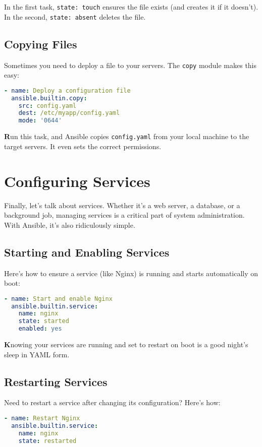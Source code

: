 In the first task, \texttt{state: touch} ensures the file exists (and creates it if it doesn't). In the second, \texttt{state: absent} deletes the file.

\subsection{Copying Files}

Sometimes you need to deploy a file to your servers. The \texttt{copy} module makes this easy:
\begin{lstlisting}[language=yaml, caption=Copying a File]
- name: Deploy a configuration file
  ansible.builtin.copy:
    src: config.yaml
    dest: /etc/myapp/config.yaml
    mode: '0644'
\end{lstlisting}

\textbf{R}un this task, and Ansible copies \texttt{config.yaml} from your local machine to the target servers. It even sets the correct permissions.

\section{Configuring Services}

Finally, let's talk about services. Whether it's a web server, a database, or a background job, managing services is a critical part of system administration. With Ansible, it's also ridiculously simple.

\subsection{Starting and Enabling Services}

Here's how to ensure a service (like Nginx) is running and starts automatically on boot:
\begin{lstlisting}[language=yaml, caption=Starting and Enabling a Service]
- name: Start and enable Nginx
  ansible.builtin.service:
    name: nginx
    state: started
    enabled: yes
\end{lstlisting}

\textbf{K}nowing your services are running and set to restart on boot is a good night's sleep in YAML form.

\subsection{Restarting Services}

Need to restart a service after changing its configuration? Here's how:
\begin{lstlisting}[language=yaml, caption=Restarting a Service]
- name: Restart Nginx
  ansible.builtin.service:
    name: nginx
    state: restarted
\end{lstlisting}

